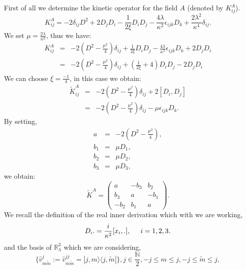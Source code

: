\documentclass[a4paper,11pt]{article} %
\newcommand{\bra}[1]{\langle{#1}|} %
\newcommand{\ket}[1]{|{#1}\rangle} %
\numberwithin{equation}{section} %
\numberwithin{figure}{section} %
\theoremstyle{plain} %
\theoremstyle{definition} %
\theoremstyle{remark} %
\begin{document}
First of all we determine the kinetic operator for the field $A$ (denoted by $K^{A}_{ij}$). 
\begin{equation*}
 K^{A}_{ij} = - 2 \delta_{ij} D^{2} + 2 D_{j} D_{i} - \frac{1}{ 2 \xi} D_{i} D_{j} - \frac{ 4 \lambda }{ \kappa^{2} } \epsilon_{ijk} D_{k} + \frac{2 \lambda^2}{\kappa^4} \delta_{ij}.
\end{equation*}
We set $ \mu = \frac{2 \lambda}{\kappa^2} $, thus we have:
\begin{eqnarray*}
 K^{A}_{ij} &=& - 2 ( D^{2} - \frac{ \mu^{2} }{4} ) \delta_{ij} + \frac{1}{ 2 \xi} D_{i} D_{j} - \frac{ 4 \lambda }{ \kappa^{2} } \epsilon_{ijk} D_{k} + 2 D_{j} D_{i} \\
            &=&  - 2 ( D^{2} - \frac{ \mu^{2} }{4} ) \delta_{ij} + ( \frac{1}{ 2 \xi} + 4 ) D_{i} D_{j} - 2 D_{j} D_{i}
\end{eqnarray*}
We can choose $\xi=\frac{-1}{4}$, in this case we obtain:
\begin{eqnarray*}
 \tilde{K}^{A}_{ij} &=& - 2 ( D^{2} - \frac{ \mu^{2} }{4} ) \delta_{ij} + 2 [ D_{i} , D_{j} ] \\
            &=& - 2 ( D^{2} - \frac{ \mu^{2} }{4} ) \delta_{ij} - \mu \epsilon_{ijk} D_{k}. 
\end{eqnarray*}
By setting,  
\begin{eqnarray*}
  a &=& -2( D^{2} - \frac{ \mu^{2} }{4} ), \\ 
  b_1 &=& \mu D_1, \\ 
  b_2 &=& \mu D_2, \\
  b_3 &=& \mu D_3,
\end{eqnarray*}
we obtain:
\begin{equation*}
 \tilde{K}^{A} =
   \begin{pmatrix}
    a & -b_3 & b_2 \\
    b_3 & a & -b_1 \\
    -b_2 & b_1 & a
   \end{pmatrix}.
\end{equation*}
We recall the definition of the real inner derivation which with we are working,
\begin{equation*}
 D_i . = \frac{i}{\kappa^2}[x_i, .], \hspace{5mm} i=1,2,3.
\end{equation*}
and the basis of $\mathbb{R}^3_{\lambda}$ which we are considering,
\begin{equation*}
 \{ \hat{v}^{j}_{m \tilde{m} } := \hat{v}^{jj}_{m \tilde{m} } = \ket{j,m} \bra{j,\tilde{m} } \}, j \in \frac{\mathbb{N}}{2}, -j \leq m \leq j, -j \leq \tilde{m} \leq j,
\end{equation*}
\end{document}
